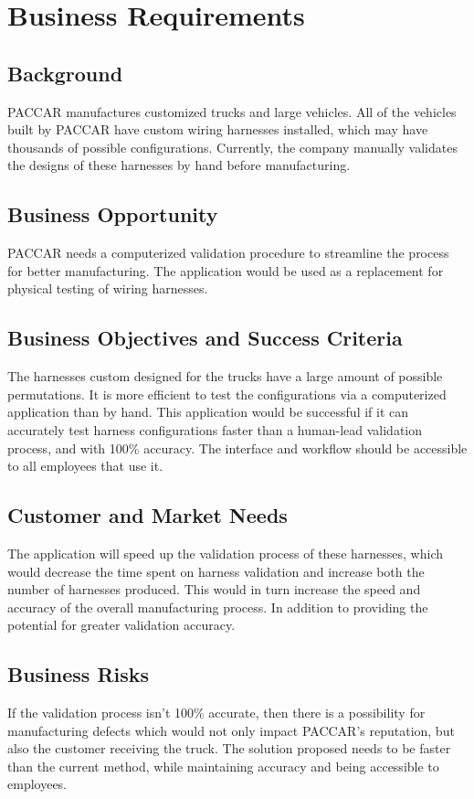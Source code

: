 \section{Business Requirements}
\subsection{Background}
 PACCAR manufactures customized trucks and large vehicles. All of the vehicles built by PACCAR have custom wiring harnesses installed, which may have thousands of possible configurations. Currently, the company manually validates the designs of these harnesses by hand before manufacturing.

\subsection{Business Opportunity}
PACCAR needs a computerized validation procedure to streamline the process for better manufacturing. The application would be used as a replacement for physical testing of wiring harnesses.


\subsection{Business Objectives and Success Criteria}
The harnesses custom designed for the trucks have a large amount of possible permutations. It is more efficient to test the configurations via a computerized application than by hand. This application would be successful if it can accurately test harness configurations faster than a human-lead validation process, and with 100\% accuracy. The interface and workflow should be accessible to all employees that use it.

\subsection{Customer and Market Needs}
 The application will speed up the validation process of these harnesses, which would decrease the time spent on harness validation and increase both the number of harnesses produced. This would in turn increase the speed and accuracy of the overall manufacturing process. In addition to providing the potential for greater validation accuracy.
 

\subsection{Business Risks}
If the validation process isn’t 100\% accurate, then there is a possibility for manufacturing defects which would not only impact PACCAR’s reputation, but also the customer receiving the truck. The solution proposed needs to be faster than the current method, while maintaining accuracy and being accessible to employees. 

